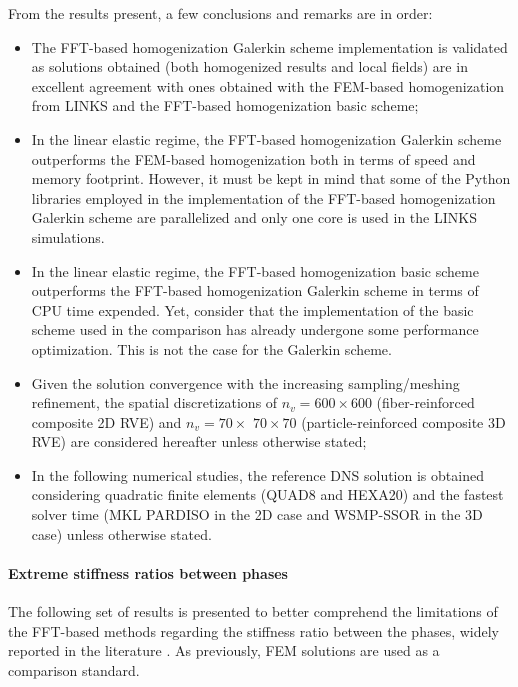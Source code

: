 From the results present, a few conclusions and remarks are in order:
\begin{itemize}
  \item The FFT-based homogenization Galerkin scheme implementation is validated as solutions obtained (both homogenized results and local fields) are in excellent agreement with ones obtained with the FEM-based homogenization from LINKS and the FFT-based homogenization basic scheme;
  \item In the linear elastic regime, the FFT-based homogenization Galerkin scheme outperforms the FEM-based homogenization both in terms of speed and memory footprint.
  However, it must be kept in mind that some of the Python libraries employed in the implementation of the FFT-based homogenization Galerkin scheme are parallelized and only one core is used in the LINKS simulations.
  \item In the linear elastic regime, the FFT-based homogenization basic scheme outperforms the FFT-based homogenization Galerkin scheme in terms of CPU time expended.
  Yet, consider that the implementation of the basic scheme used in the comparison \cite{} has already undergone some performance optimization.
  This is not the case for the Galerkin scheme.
  \item Given the solution convergence with the increasing sampling/meshing refinement, the spatial discretizations of \(n_{v}=600 \times 600\) (fiber-reinforced composite 2D RVE) and \(n_{v}=70 \times\) \(70 \times 70\) (particle-reinforced composite 3D RVE) are considered hereafter unless otherwise stated;
  \item In the following numerical studies, the reference DNS solution is obtained considering quadratic finite elements (QUAD8 and HEXA20) and the fastest solver time (MKL PARDISO in the 2D case and WSMP-SSOR in the \(3 \mathrm{D}\) case) unless otherwise stated.
\end{itemize}

\FloatBarrier

\paragraph{Extreme stiffness ratios between phases}

The following set of results is presented to better comprehend the limitations of the FFT-based methods regarding the stiffness ratio between the phases, widely reported in the literature \cite{}.
As previously, FEM solutions are used as a comparison standard.

